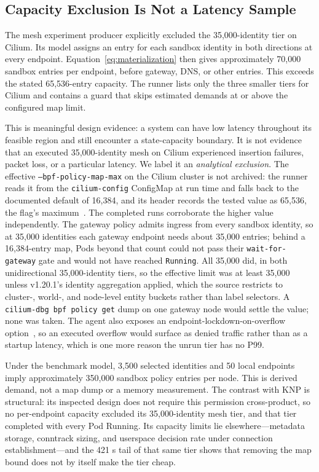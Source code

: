 \documentclass[letterpaper,twocolumn,10pt]{article}
\newcommand{\sys}{\textsc{KNP}}
\begin{document}
\subsection{Capacity Exclusion Is Not a Latency Sample}
The mesh experiment producer explicitly excluded the 35,000-identity
tier on Cilium. Its model assigns an entry for each sandbox identity in both
directions at every endpoint. Equation~\ref{eq:materialization} then
gives approximately 70,000 sandbox entries per endpoint, before gateway,
DNS, or other entries. This exceeds the stated 65,536-entry capacity.
The runner lists only the three smaller tiers for Cilium and contains a guard
that skips estimated demands at or above the configured map limit.

This is meaningful design evidence: a system can have low latency
throughout its feasible region and still encounter a state-capacity
boundary. It is not evidence that an executed 35,000-identity mesh on Cilium
experienced insertion failures, packet loss, or a particular latency.
We label it an \emph{analytical exclusion}. The effective
\texttt{--bpf-policy-map-max} on the Cilium cluster is not archived: the
runner reads it from the \texttt{cilium-config} ConfigMap at run time and
falls back to the documented default of 16,384, and its header records
the tested value as 65,536, the flag's maximum~\cite{ciliumagentref}. The
completed runs corroborate the higher value independently. The gateway
policy admits ingress from every sandbox identity, so at 35,000
identities each gateway endpoint needs about 35,000 entries; behind a
16,384-entry map, Pods beyond that count could not pass their
\texttt{wait-for-gateway} gate and would not have reached
\texttt{Running}. All 35,000 did, in both unidirectional 35,000-identity
tiers, so the effective limit was at least 35,000 unless v1.20.1's
identity aggregation applied, which the source restricts to
cluster-, world-, and node-level entity buckets rather than label
selectors. A \texttt{cilium-dbg bpf policy get} dump on one gateway node
would settle the value; none was taken. The agent also exposes an
endpoint-lockdown-on-overflow option~\cite{ciliumagentref}, so an
executed overflow would surface as denied traffic rather than as a
startup latency, which is one more reason the unrun tier has no P99.

Under the benchmark model, 3,500 selected identities and 50 local
endpoints imply approximately 350,000 sandbox policy entries per node.
This is derived demand, not a map dump or a memory measurement.
The contrast with \sys{} is structural: its inspected design does not
require this permission cross-product, so no per-endpoint capacity
excluded its 35,000-identity mesh tier, and that tier completed with
every Pod Running. Its capacity limits lie elsewhere---metadata storage,
conntrack sizing, and userspace decision rate under connection
establishment---and the 421 s tail of that same tier shows that removing
the map bound does not by itself make the tier cheap.
\end{document}
